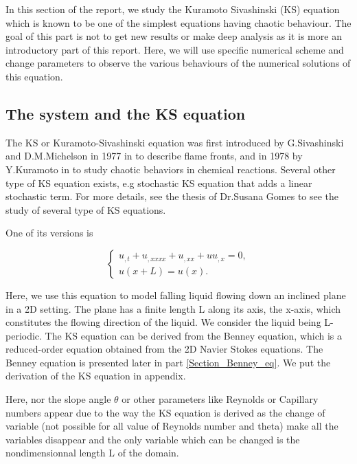 \documentclass[12pt]{article}
\begin{document}
In this section of the report, we study the Kuramoto Sivashinski (KS) equation which is known to be one of the simplest equations having 
chaotic behaviour.  The goal of this part is not to get new results or make deep analysis as it is more an introductory part of this report. 
Here, we will use specific numerical scheme and change parameters to observe the various behaviours of the numerical solutions of this equation. 

\subsection{The system and the KS equation}

The KS or Kuramoto-Sivashinski equation was first introduced by G.Sivashinski and D.M.Michelson in 1977 in \cite{Shiv_Michelson_KS_eq} to describe 
flame fronts, and in 1978 by Y.Kuramoto in \cite{Kuramoto_KS_eq} to study chaotic behaviors in chemical reactions. Several other type of KS equation 
exists, e.g stochastic KS equation that adds a linear stochastic term. For more details, see the thesis of Dr.Susana Gomes \cite{Susana_thesis} to see the study 
of several type of KS equations.

One of its versions is

\begin{equation}\label{KS_eq_L}
\left\{
\begin{aligned}
    u_{,t} + u_{,xxxx}  + u_{,xx} + uu_{,x} = 0, \\
    u(x+L)=u(x). 
\end{aligned}
\right.
\end{equation}



Here, we use this equation to model falling liquid flowing down an inclined plane in a 2D setting. The plane has a finite length L along its axis, the x-axis, 
which constitutes the flowing direction of the liquid. We consider the liquid being L-periodic. The KS equation can be derived from the Benney equation, which 
is a reduced-order equation obtained from the 2D Navier Stokes equations. The Benney equation is presented later in part \ref{Section_Benney_eq}. We put the 
derivation of the KS equation in appendix. 

Here, nor the slope angle $\theta$ or other parameters like Reynolds or Capillary numbers appear due to the way the KS equation is derived as the change of 
variable (not possible for all value of Reynolds number and theta) make all the variables disappear and the only variable which can be changed is the nondimensionnal 
length L of the domain. 
\\
\end{document}

